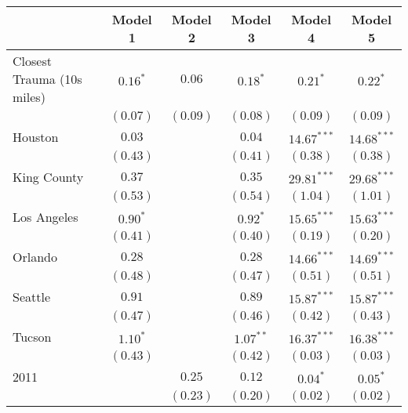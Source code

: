 
\begin{table}[ht!]
\begin{center}
\begin{tabular}{l c c c c c}
\toprule
 & Model 1 & Model 2 & Model 3 & Model 4 & Model 5 \\
\midrule
Closest Trauma (10s miles) & $0.16^{*}$    & $0.06$        & $0.18^{*}$    & $0.21^{*}$     & $0.22^{*}$     \\
                           & $(0.07)$      & $(0.09)$      & $(0.08)$      & $(0.09)$       & $(0.09)$       \\
Houston                    & $0.03$        &               & $0.04$        & $14.67^{***}$  & $14.68^{***}$  \\
                           & $(0.43)$      &               & $(0.41)$      & $(0.38)$       & $(0.38)$       \\
King County                & $0.37$        &               & $0.35$        & $29.81^{***}$  & $29.68^{***}$  \\
                           & $(0.53)$      &               & $(0.54)$      & $(1.04)$       & $(1.01)$       \\
Los Angeles                & $0.90^{*}$    &               & $0.92^{*}$    & $15.65^{***}$  & $15.63^{***}$  \\
                           & $(0.41)$      &               & $(0.40)$      & $(0.19)$       & $(0.20)$       \\
Orlando                    & $0.28$        &               & $0.28$        & $14.66^{***}$  & $14.69^{***}$  \\
                           & $(0.48)$      &               & $(0.47)$      & $(0.51)$       & $(0.51)$       \\
Seattle                    & $0.91$        &               & $0.89$        & $15.87^{***}$  & $15.87^{***}$  \\
                           & $(0.47)$      &               & $(0.46)$      & $(0.42)$       & $(0.43)$       \\
Tucson                     & $1.10^{*}$    &               & $1.07^{**}$   & $16.37^{***}$  & $16.38^{***}$  \\
                           & $(0.43)$      &               & $(0.42)$      & $(0.03)$       & $(0.03)$       \\
2011                       &               & $0.25$        & $0.12$        & $0.04^{*}$     & $0.05^{*}$     \\
                           &               & $(0.23)$      & $(0.20)$      & $(0.02)$       & $(0.02)$       \\

\end{tabular}
\end{center}
\end{table}
